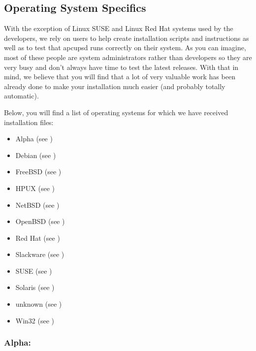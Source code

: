 \subsection*{Operating System Specifics}

\label{index-OSes-31}
With the exception of Linux SUSE and Linux Red Hat systems used by the
developers, we rely on users to help create installation scripts and
instructions as well as to test that apcupsd runs correctly on their system.
As you can imagine, most of these people are system administrators rather than
developers so they are very busy and don't always have time to test the latest
releases.  With that in mind, we believe that you will find that a lot of very
valuable work has been already done to make your installation much easier (and
probably totally automatic).  

Below, you will find a list of operating systems for which we have received
installation files:  

\begin{itemize}
\item Alpha (see 
   )  
\item Debian (see 
   )  
\item FreeBSD (see 
   )  
\item HPUX (see 
   )  
\item NetBSD (see 
   )  
\item OpenBSD (see 
   )  
\item Red Hat (see 
   )  
\item Slackware (see 
   )  
\item SUSE (see 
   )  
\item Solaris (see 
   )  
\item unknown (see 
   )  
\item Win32 (see 
   ) 
\end{itemize}

\label{Alpha}

\subsubsection*{Alpha:}

